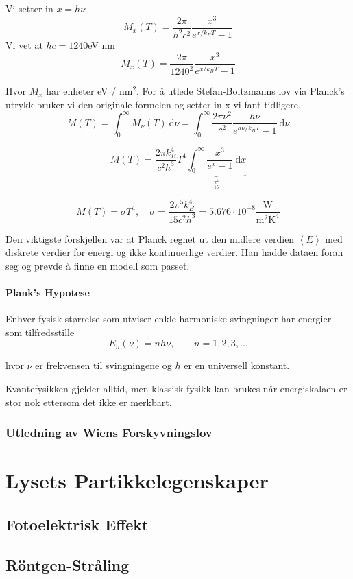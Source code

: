 Vi setter in $x = hν$
\begin{equation}
M_{x}(T) = \frac{2π}{h^{2}c^{2}} \frac{x^{3}}{e^{x/k_{B}T} - 1}
\end{equation}
Vi vet at $hc = 1240 $eV nm 
\begin{equation}
M_{x}(T) = \frac{2π}{1240^{2}} \frac{x^{3}}{e^{x/k_{B}T} - 1}
\end{equation}

Hvor $M_{x}$ har enheter eV / nm$^{2}$. For å utlede Stefan-Boltzmanns lov via Planck's utrykk bruker vi den originale formelen og setter in x vi fant tidligere. 
\begin{equation}
M(T) = \int_{0}^{∞} M_{ν}(T) \ \mathrm{d}ν = \int_{0}^{∞} \frac{2πν^{2}}{c^{2}} \frac{hν}{e^{hν / k_{B}T} - 1} \ \mathrm{d}ν
\end{equation} 

\begin{equation}
M(T) = \frac{2πk^{4}_{B}}{c^{2}h^{3}}T^{4} \underbrace{\int_{0}^{∞} \frac{x^{3}}{e^{x} - 1} \ \mathrm{d}x}_{\frac{π^{4}}{15}}
\end{equation}

\begin{equation}
M(T) = σT^{4}, \quad σ = \frac{2π^{5}k^{4}_{B}}{15c^{2}h^{3}} = 5.676 ⋅ 10^{-8} \frac{\text{W}}{\text{m}^{2} \text{K}^{4}}
\end{equation}

Den viktigste forskjellen var at Planck regnet ut den midlere verdien $\left< E \right>$ med diskrete verdier for energi og ikke kontinuerlige verdier. Han hadde dataen foran seg og prøvde å finne en modell som passet. 

\subsubsection*{Plank's Hypotese}
Enhver fysisk størrelse som utviser enkle harmoniske svingninger har energier som tilfredsstille
\begin{equation}
E_n(ν) = nhν, \qquad n = 1, 2, 3, \dots
\end{equation}

hvor $ν$ er frekvensen til svingningene og $h$ er en universell konstant. 

Kvantefysikken gjelder alltid, men klassisk fysikk kan brukes når energiskalaen er stor nok ettersom det ikke er merkbart. 

\subsection{Utledning av Wiens Forskyvningslov}

 \chapter{Lysets Partikkelegenskaper}
 \section{Fotoelektrisk Effekt}
 
 
 \section{Röntgen-Stråling}
 